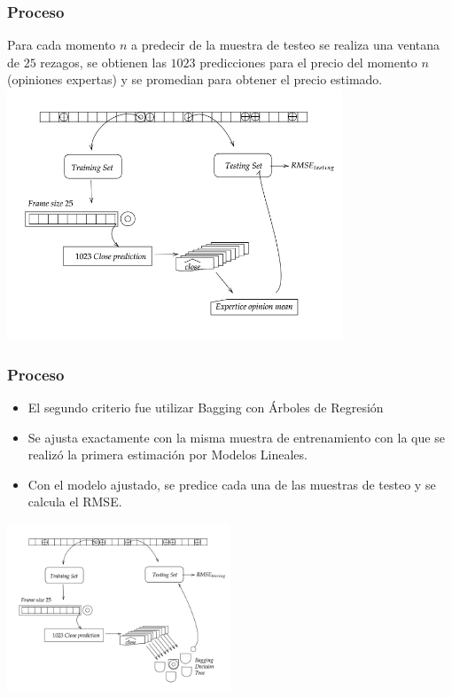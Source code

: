 \documentclass{beamer}
\begin{document}
\begin{frame}[t]
\frametitle{Proceso}
\vfill
Para cada momento $n$ a predecir de la muestra de testeo se realiza una ventana de $25$ rezagos, se obtienen las $1023$ predicciones para el precio del momento $n$ (opiniones expertas) y se promedian para obtener el precio estimado.
\vfill
\centering
\includegraphics[width=0.75\textwidth]{diagramExpertMean}
\end{frame}

\begin{frame}[t]
\frametitle{Proceso}
\vfill
\begin{itemize}
\item
El segundo criterio fue utilizar Bagging con Árboles de Regresión
\item
Se ajusta exactamente con la misma muestra de entrenamiento con la que se realizó la primera estimación por Modelos Lineales. 
\item
Con el modelo ajustado, se predice cada una de las muestras de testeo y se calcula el RMSE. 
\end{itemize}
\vfill
\centering
\includegraphics[width=0.5\textwidth]{diagramBagging}
\end{frame}
\end{document}
